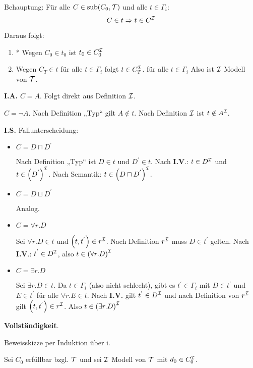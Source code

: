Behauptung: Für alle $C \in \sub\left( C_{0},\MT \right)$ und alle
$t \in \Gamma_{i}$:
$$C \in t \Rightarrow t \in C^{\mathcal{I}}$$

Daraus folgt:

\begin{enumerate}
\def\labelenumi{\arabic{enumi}.}
\item
  * Wegen $C_{0} \in t_{0}$ ist $t_{0} \in C_{0}^{\mathcal{I}}$
\item
  Wegen $C_{T} \in t$ für alle $t \in \Gamma_{i}$ folgt
  $t \in C_{T}^{\mathcal{I}}$. für alle $t \in \Gamma_{i}$ Also ist $\mathcal{I}$ Modell von $\mathcal{T}$.
\end{enumerate}

\textbf{I.A.} $C = A$. Folgt direkt aus Definition $\mathcal{I}$.

$C = \neg A$. Nach Definition „Typ`` gilt $A \notin t$. Nach
Definition $\mathcal{I}$ ist $t \notin A^{\mathcal{I}}$.

\textbf{I.S.} Fallunterscheidung:

\begin{itemize}
\item
  $C = D \sqcap D^{'}$

Nach Definition „Typ`` ist $D \in t$ und $D^{'} \in t$. Nach
\textbf{I.V}.: $t \in D^{\mathcal{I}}$ und $t \in \left( D^{'} \right)^\MI$.
Nach Semantik: $t \in \left( D \sqcap D^{'} \right)^\MI$.

\item
  $C = D \sqcup D^{'}$

Analog.

\item
  $C = \forall r.D$

Sei $\forall r.D \in t$ und $\left( t,t^{'} \right) \in r^\MI$. Nach
Definition $r^{\mathcal{I}}$ muss $D \in t^{'}$ gelten. Nach \textbf{I.V}.:
$t^{'} \in D^{\mathcal{I}}$, also $t \in \left( \forall r.D \right)^\MI$

\item
  $C = \exists r.D$

Sei $\exists r.D \in t$. Da $t \in \Gamma_{i}$ (also nicht
schlecht), gibt es $t^{'} \in \Gamma_{i}$ mit $D \in t^{'}$ und
$E \in t^{'}$ für alle $\forall r.E \in t$. Nach \textbf{I.V.} gilt
$t^{'} \in D^{\mathcal{I}}$ und nach Definition von $r^{\mathcal{I}}$ gilt
$\left( t,t^{'} \right) \in r^\MI$. Also
$t \in \left( \exists r.D \right)^\MI$
\end{itemize}

\textbf{Vollständigkeit}. 

Beweisskizze per Induktion über i.

Sei $C_{0}$ erfüllbar bzgl. $\mathcal{T}$ und sei $\mathcal{I}$ Modell von $\mathcal{T}$ mit
$d_{0} \in C_{0}^{\mathcal{I}}$. 

